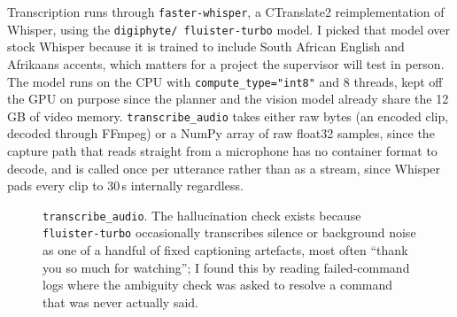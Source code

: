 \label{sec:speech}

\label{sec:stt}

Transcription runs through \texttt{faster-whisper}, a CTranslate2
reimplementation of Whisper, using the \texttt{digiphyte/\allowbreak
fluister-turbo} model. I picked that model over stock Whisper because it is
trained to include South African English and Afrikaans accents, which
matters for a project the supervisor will test in person. The model runs on
the CPU with \texttt{compute\_type="int8"} and 8 threads, kept off the GPU on
purpose since the planner and the vision model already share the 12\,GB of
video memory. \texttt{transcribe\_audio} takes either raw bytes (an encoded
clip, decoded through FFmpeg) or a NumPy array of raw float32 samples, since
the capture path that reads straight from a microphone has no container
format to decode, and is called once per utterance rather than as a stream,
since Whisper pads every clip to 30\,s internally regardless.

\begin{figure}[htbp]
  \centering
  \caption{\texttt{transcribe\_audio}. The hallucination check exists because \texttt{fluister-turbo} occasionally transcribes silence or background noise as one of a handful of fixed captioning artefacts, most often ``thank you so much for watching''; I found this by reading failed-command logs where the ambiguity check was asked to resolve a command that was never actually said.}
  \label{fig:flow-stt}
\end{figure}

